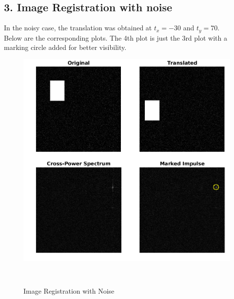 \documentclass[12pt, a4paper]{article}
\begin{document}
\subsection*{3. Image Registration with noise}
In the noisy case, the translation was obtained at $t_x = -30$ and $t_y = 70$. \\
Below are the corresponding plots. The 4th plot is just the 3rd plot with a marking circle added for better visibility.
\vspace*{65pt}
\begin{figure}[h!]
    \centering
    \renewcommand{\thefigure}{5.2}
    \begin{minipage}[c][1\width]{0.7\textwidth}
    	\hspace*{-0.8in}
    	\includegraphics[width=1.34\textwidth]{noisy.png}
    	\caption{Image Registration with Noise}
	    \label{fig:5.2}
    \end{minipage} \\
\end{figure}
\vspace*{40pt}
\newpage
\end{document}
